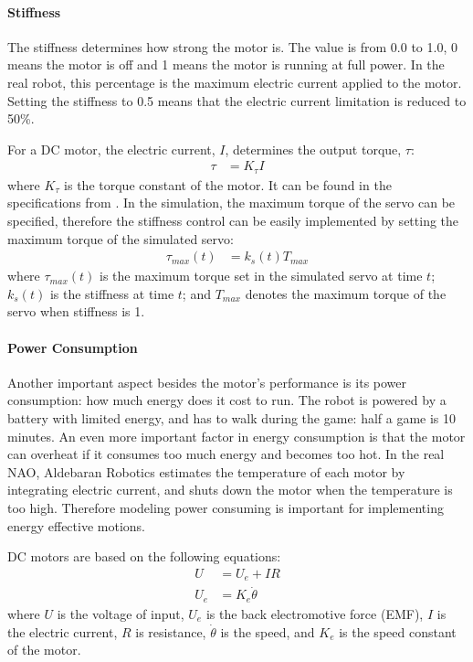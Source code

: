 \documentclass{llncs}
\begin{document}
\paragraph{Stiffness}
The stiffness determines how strong the motor is. The value is from 0.0
to 1.0, 0 means the motor is off and 1 means the motor is running at
full power. In the real robot,
this percentage is the maximum electric current applied to the motor. Setting the
stiffness to 0.5 means that the electric current limitation is reduced
to 50\%.

For a DC motor, the electric current, $I$, determines the output torque,
$\tau$:
\begin{align}
  \tau &= K_\tau I \label{eq:tau-i}
\end{align}
where $K_\tau$ is the torque constant of the motor. It can be found in the
specifications from \cite{naoqi}. In
the simulation, the maximum torque of the servo can be specified, therefore the
stiffness control can be easily implemented by setting the maximum torque
of the simulated servo:
\begin{align}
  \tau_{max}(t) &= k_{s}(t) T_{max}
\end{align}
where $\tau_{max}(t)$ is the maximum torque set in the simulated servo at
time $t$; $k_{s}(t)$ is the stiffness at time $t$; and $T_{max}$
denotes the maximum torque of the servo when stiffness is 1.

\paragraph{Power Consumption}
Another important aspect besides the motor's performance is its
power consumption: how much energy does it cost to run.
The robot is powered by a battery with limited energy, and has to walk during the
game: half a game is 10 minutes.
An even more important factor in energy consumption is
that the motor can overheat if it consumes too much energy and
becomes too hot. In the real NAO, Aldebaran Robotics estimates the temperature
of each motor by integrating electric current, and shuts down the motor
when the temperature is too high. Therefore modeling power consuming
is important for implementing energy effective motions.

DC motors are based on the following equations:
\begin{align}
  U &= U_e + IR \label{eq:u-ir}\\
  U_e &= K_e \dot{\theta} \label{eq:u-ke}
\end{align}
where $U$ is the voltage of input, $U_e$ is the back electromotive
force (EMF), $I$ is the electric current, $R$ is resistance,
$\dot{\theta}$ is the speed, and $K_e$ is the speed constant of the motor.
\end{document}
